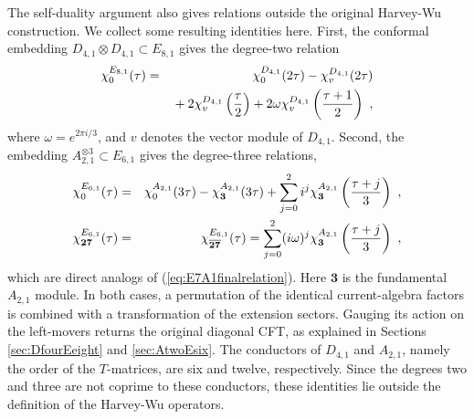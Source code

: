 \documentclass[12pt]{article}
\numberwithin{equation}{section}
\newcommand{\bea}{\begin{eqnarray}}
\newcommand{\eea}{\end{eqnarray}}
\def\no{\nonumber}
\theoremstyle{remark}
\begin{document}
The self-duality argument also gives relations outside the original Harvey-Wu construction. We collect some resulting identities here. First, the conformal embedding $D_{4,1}\otimes D_{4,1}\subset E_{8,1}$ gives the degree-two relation
\bea
\chi^{E_{8,1}}_0(\tau)&=&\chi^{D_{4,1}}_0(2\tau)-\chi^{D_{4,1}}_v(2\tau)\no\\
&&{}+2\chi^{D_{4,1}}_v\left({\tau\over2}\right)+2\omega\chi^{D_{4,1}}_v\left({\tau+1\over2}\right)~,
\eea
where $\omega=e^{2\pi i/3}$, and $v$ denotes the vector module of $D_{4,1}$. Second, the embedding $A_{2,1}^{\otimes3}\subset E_{6,1}$ gives the degree-three relations,
\bea
\chi^{E_{6,1}}_0(\tau)&=&\chi^{A_{2,1}}_0(3\tau)-\chi^{A_{2,1}}_{\mathbf3}(3\tau)+\sum_{j=0}^2i^j\chi^{A_{2,1}}_{\mathbf3}\left({\tau+j\over3}\right)~,\no\\
\chi^{E_{6,1}}_{\mathbf{27}}(\tau)&=&\chi^{E_{6,1}}_{\overline{\mathbf{27}}}(\tau)=\sum_{j=0}^2(i\omega)^j\chi^{A_{2,1}}_{\mathbf3}\left({\tau+j\over3}\right)~,
\eea
which are direct analogs of (\ref{eq:E7A1finalrelation}).
Here $\mathbf3$ is the fundamental $A_{2,1}$ module. In both cases, a permutation of the identical current-algebra factors is combined with a transformation of the extension sectors. Gauging its action on the left-movers returns the original diagonal CFT, as explained in Sections \ref{sec:DfourEeight} and \ref{sec:AtwoEsix}. The conductors of $D_{4,1}$ and $A_{2,1}$, namely the order of the $T$-matrices, are six and twelve, respectively. Since the degrees two and three are not coprime to these conductors, these identities lie outside the definition of the Harvey-Wu operators.
\end{document}

